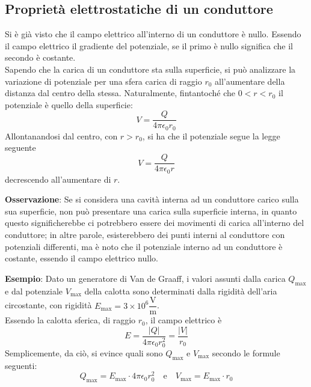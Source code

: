 \documentclass[a4paper]{extarticle}
\begin{document}
\subsection{Proprietà elettrostatiche di un conduttore}
Si è già visto che il campo elettrico all'interno di un conduttore è nullo. Essendo il campo elettrico il gradiente del potenziale, se il primo è nullo significa che il secondo è costante.\\
Sapendo che la carica di un conduttore sta sulla superficie, si può analizzare la variazione di potenziale per una sfera carica di raggio $r_0$ all'aumentare della distanza dal centro della stessa. Naturalmente, fintantoché che $0<r<r_0$ il potenziale è quello della superficie:
\[V=\frac{Q}{4 \pi \epsilon_0 r_0}\]
Allontanandosi dal centro, con $r>r_0$, si ha che il potenziale segue la legge seguente
\[V=\frac{Q}{4 \pi \epsilon_0 r}\]
decrescendo all'aumentare di $r$.

\vspace{1em}
\noindent
\textbf{Osservazione}: Se si considera una cavità interna ad un conduttore carico sulla sua superficie, non può presentare una carica sulla superficie interna, in quanto questo significherebbe ci potrebbero essere dei movimenti di carica all'interno del conduttore; in altre parole, esisterebbero dei punti interni al conduttore con potenziali differenti, ma è noto che il potenziale interno ad un conduttore è costante, essendo il campo elettrico nullo.

\vspace{1em}
\noindent
\textbf{Esempio}: Dato un generatore di Van de Graaff, i valori assunti dalla carica $Q_{\max}$ e dal potenziale $V_{\max}$ della calotta sono determinati dalla rigidità dell'aria circostante, con rigidità $E_{\max} = 3 \times 10^6 \dfrac{\text{V}}{\text{m}}$.\\
Essendo la calotta sferica, di raggio $r_0$, il campo elettrico è
\[E=\frac{\vert Q \vert}{4 \pi \epsilon_0 r_0^2} = \frac{\vert V \vert}{r_0}\] Semplicemente, da ciò, si evince quali sono $Q_{\max}$ e $V_{\max}$ secondo le formule seguenti:
\[Q_{\max} = E_{\max} \cdot 4 \pi \epsilon_0 r_0^2 \hspace{1em} \text{e} \hspace{1em} V_{\max} = E_{\max} \cdot r_0\]

\newpage
\end{document}
